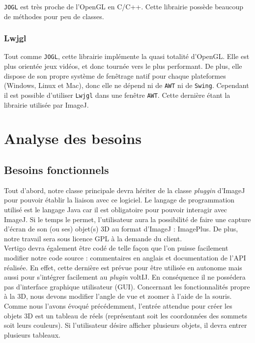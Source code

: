 \documentclass[11pt]{report}
\begin{document}
\texttt{JOGL} est très proche de l'OpenGL en C/C++. Cette librairie possède beaucoup de méthodes pour peu de classes.


\subsection{Lwjgl}
Tout comme \texttt{JOGL}, cette librairie implémente la quasi totalité d'OpenGL. Elle est plus orientée jeux vidéos, et donc tournée vers le plus performant. De plus, elle dispose de son propre système de fenêtrage natif pour chaque plateformes (Windows, Linux et Mac), donc elle ne dépend ni de \texttt{AWT} ni de \texttt{Swing}. 
Cependant il est possible d'utiliser \texttt{Lwjgl} dans une fenêtre \texttt{AWT}.
Cette dernière étant la librairie utilisée par ImageJ.

\chapter{Analyse des besoins}

\section{Besoins fonctionnels}
Tout d'abord, notre classe principale devra hériter de la classe \textit{pluggin} d'ImageJ pour pouvoir établir la liaison avec ce logiciel.
Le langage de programmation utilisé est le langage Java car il est obligatoire pour pouvoir interagir avec ImageJ. Si le temps le permet, l'utilisateur aura la possibilité de faire une capture d'écran de son (ou ses) objet(s) 3D au format d'ImageJ : ImagePlus.
De plus, notre travail sera sous licence GPL à la demande du client.\\

Vertigo devra également être codé de telle façon que l'on puisse facilement modifier notre code source : commentaires en anglais et documentation de l'API réalisée. En effet, cette dernière est prévue pour être utilisée en autonome mais aussi pour s'intégrer facilement au \textit{plugin} voltIJ. En conséquence il ne possédera pas d'interface graphique utilisateur (GUI).
Concernant les fonctionnalités propre à la 3D, nous devons modifier l'angle de vue et zoomer  à l'aide de la souris.
Comme nous l'avons évoqué précédemment, l'entrée attendue pour créer les objets 3D est un tableau de réels (représentant soit les coordonnées des sommets soit leurs couleurs). Si l'utilisateur désire afficher plusieurs objets, il devra entrer plusieurs tableaux.\\
\end{document}
